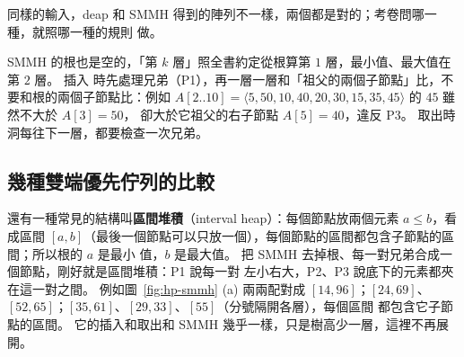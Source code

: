 \begin{center}

\label{fig:hp-smmh}
\end{center}

同樣的輸入，deap 和 SMMH 得到的陣列不一樣，兩個都是對的；考卷問哪一種，就照哪一種的規則
做。

\begin{examnote}
SMMH 的根也是空的，「第 $k$ 層」照全書約定從根算第 $1$ 層，最小值、最大值在第 $2$ 層。 插入
時先處理兄弟（P1），再一層一層和「祖父的兩個子節點」比，不要和根的兩個子節點比：例如
$A[2..10] = \langle 5, 50, 10, 40, 20, 30, 15, 35, 45 \rangle$ 的 $45$ 雖然不大於 $A[3] = 50$，
卻大於它祖父的右子節點 $A[5] = 40$，違反 P3。 取出時洞每往下一層，都要檢查一次兄弟。
\end{examnote}

\subsection{幾種雙端優先佇列的比較}
\label{sec:hp-depq}

還有一種常見的結構叫\textbf{區間堆積}（interval heap）：每個節點放兩個元素 $a \le b$，看成區間
$[a, b]$（最後一個節點可以只放一個），每個節點的區間都包含子節點的區間；所以根的 $a$ 是最小
值，$b$ 是最大值。 把 SMMH 去掉根、每一對兄弟合成一個節點，剛好就是區間堆積：P1 說每一對
左小右大，P2、P3 說底下的元素都夾在這一對之間。 例如圖~\ref{fig:hp-smmh} (a) 兩兩配對成
$[14, 96]$；$[24, 69]$、$[52, 65]$；$[35, 61]$、$[29, 33]$、$[55]$（分號隔開各層），每個區間
都包含它子節點的區間。 它的插入和取出和 SMMH
幾乎一樣，只是樹高少一層，這裡不再展開。


